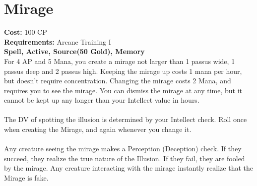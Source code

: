\section{Mirage}
\textbf{Cost:} 100 CP\\
\textbf{Requirements:}  Arcane Training I\\
\textbf{Spell, Active, Source(50 Gold), Memory}\\
For 4 AP and 5 Mana, you create a mirage not larger than 1 passus wide, 1 passus deep and 2 passus high. Keeping the mirage up costs 1 mana per hour, but doesn't require concentration. Changing the mirage costs 2 Mana, and requires you to see the mirage. You can dismiss the mirage at any time, but it cannot be kept up any longer than your Intellect value in hours.\\
\\
The DV of spotting the illusion is determined by your Intellect check. Roll once when creating the Mirage, and again whenever you change it. \\
\\
Any creature seeing the mirage makes a Perception (Deception) check. If they succeed, they realize the true nature of the Illusion. If they fail, they are fooled by the mirage. Any creature interacting with the mirage instantly realize that the Mirage is fake.\\